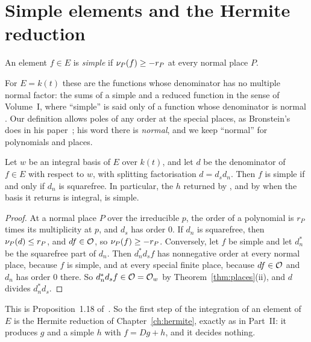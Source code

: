 \section{Simple elements and the Hermite reduction}\label{sec:mono-hermite}

\begin{definition}\label{def:simple}
An element $f \in E$ is \emph{simple} if $\nu_{P}(f) \ge -r_P$ at every
normal place $P$.
\end{definition}

For $E = k(t)$ these are the functions whose denominator has no multiple
normal factor: the sums of a simple and a reduced function in the sense of
Volume~I, where ``simple'' is said only of a function whose denominator is
normal . Our definition allows
poles of any order at the special places, as Bronstein's does in his
paper~\cite[Definition~1.4]{bronstein1990}; his word there is \emph{normal},
and we keep ``normal'' for polynomials and places.

\begin{proposition}\label{prop:simple}
Let $w$ be an integral basis of $E$ over $k(t)$, and let $d$ be the
denominator of $f \in E$ with respect to $w$, with splitting factorisation $d
= d_s d_n$. Then $f$ is simple if and only if $d_n$ is squarefree. In
particular, the $h$ returned by , and by
 when the basis it returns is integral, is simple.
\end{proposition}

\begin{proof}
At a normal place $P$ over the irreducible $p$, the order of a polynomial is
$r_P$ times its multiplicity at $p$, and $d_s$ has order $0$. If $d_n$ is
squarefree, then $\nu_{P}(d) \le r_P$, and $d f \in \mathcal{O}$, so $\nu_{P}(f) \ge
-r_P$. Conversely, let $f$ be simple and let $d_n^*$ be the squarefree part of
$d_n$. Then $d_n^* d_s f$ has nonnegative order at every normal place,
because $f$ is simple, and at every special finite place, because $d f \in
\mathcal{O}$ and $d_n$ has order $0$ there. So $d_n^* d_s f \in \mathcal{O} = \mathcal{O}_w$ by
Theorem~\ref{thm:places}(ii), and $d$ divides $d_n^* d_s$.
\end{proof}

This is Proposition~1.18 of~\cite{bronstein1990}. So the first step of the
integration of an element of $E$ is the Hermite reduction of
Chapter~\ref{ch:hermite}, exactly as in Part~II: it produces $g$ and a simple
$h$ with $f = Dg + h$, and it decides nothing.

